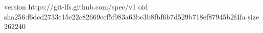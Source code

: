 version https://git-lfs.github.com/spec/v1
oid sha256:f6dcd2733e15e22c82669ecf5f983a63be3b8fbf6b7d529b718ef87945b2f4fa
size 262240

